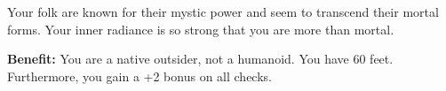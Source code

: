 
Your folk are known for their mystic power and seem to transcend their mortal forms. Your inner radiance is so strong that you are more than mortal.

\textbf{Benefit:} You are a native outsider, not a humanoid. You have 60 feet. Furthermore, you gain a +2 bonus on all  checks.